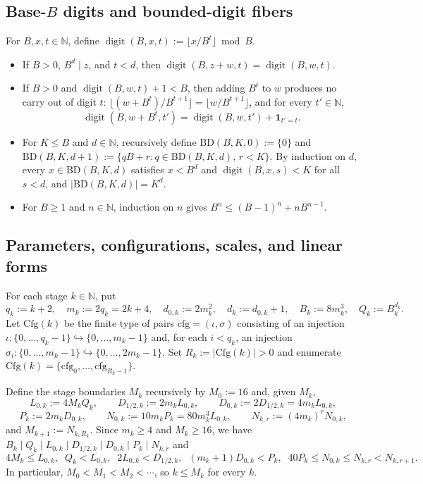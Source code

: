 \documentclass[11pt,a4paper]{amsart}
\newcommand{\digit}{\operatorname{digit}}
\begin{document}
\subsection*{\texorpdfstring{Base-$B$ digits and bounded-digit fibers}{Base-B digits and bounded-digit fibers}}
For $B, x, t \in \mathbb{N}$, define $\digit(B, x, t) := \lfloor x / B^t \rfloor \bmod B$.
\begin{itemize}
\item If $B > 0$, $B^d \mid z$, and $t < d$, then $\digit(B, z + w, t) = \digit(B, w, t)$.
\item If $B > 0$ and $\digit(B, w, t) + 1 < B$, then adding $B^t$ to $w$ produces no carry out of digit $t$: $\lfloor (w + B^t) / B^{t+1} \rfloor = \lfloor w / B^{t+1} \rfloor$, and for every $t' \in \mathbb{N}$,
\[
\digit(B, w + B^t, t') = \digit(B, w, t') + \mathbf{1}_{t' = t}.
\]
\item For $K \le B$ and $d \in \mathbb{N}$, recursively define $\mathrm{BD}(B, K, 0) := \{0\}$ and $\mathrm{BD}(B, K, d + 1) := \{q B + r : q \in \mathrm{BD}(B, K, d),\, r < K\}$. By induction on $d$, every $x \in \mathrm{BD}(B, K, d)$ satisfies $x < B^d$ and $\digit(B, x, s) < K$ for all $s < d$, and $|\mathrm{BD}(B, K, d)| = K^d$.
\item For $B \ge 1$ and $n \in \mathbb{N}$, induction on $n$ gives $B^n \le (B - 1)^n + n B^{n - 1}$.
\end{itemize}

\subsection*{Parameters, configurations, scales, and linear forms}
For each stage $k \in \mathbb{N}$, put
\[
q_k := k + 2, \quad m_k := 2 q_k = 2k + 4, \quad d_{0,k} := 2 m_k^2, \quad d_k := d_{0,k} + 1, \quad B_k := 8 m_k^3, \quad Q_k := B_k^{d_k}.
\]
Let $\mathrm{Cfg}(k)$ be the finite type of pairs $\mathrm{cfg} = (\iota, \sigma)$ consisting of an injection $\iota : \{0, \dots, q_k - 1\} \hookrightarrow \{0, \dots, m_k - 1\}$ and, for each $i < q_k$, an injection $\sigma_i : \{0, \dots, m_k - 1\} \hookrightarrow \{0, \dots, 2 m_k - 1\}$. Set $R_k := |\mathrm{Cfg}(k)| > 0$ and enumerate $\mathrm{Cfg}(k) = \{\mathrm{cfg}_0, \dots, \mathrm{cfg}_{R_k - 1}\}$.

Define the stage boundaries $M_k$ recursively by $M_0 := 16$ and, given $M_k$,
\[
L_{0,k} := 4 M_k Q_k, \qquad D_{1/2,k} := 2 m_k L_{0,k}, \qquad D_{0,k} := 2 D_{1/2,k} = 4 m_k L_{0,k},
\]
\[
P_k := 2 m_k D_{0,k}, \qquad N_{0,k} := 10 m_k P_k = 80 m_k^3 L_{0,k}, \qquad N_{k,r} := (4 m_k)^r N_{0,k},
\]
and $M_{k+1} := N_{k, R_k}$. Since $m_k \ge 4$ and $M_k \ge 16$, we have $B_k \mid Q_k \mid L_{0,k} \mid D_{1/2,k} \mid D_{0,k} \mid P_k \mid N_{k,r}$ and
\[
4 M_k \le L_{0,k}, \;\; Q_k < L_{0,k}, \;\; 2 L_{0,k} < D_{1/2,k}, \;\; (m_k + 1) D_{0,k} < P_k, \;\; 40 P_k \le N_{0,k} \le N_{k,r} < N_{k,r+1}.
\]
In particular, $M_0 < M_1 < M_2 < \cdots$, so $k \le M_k$ for every $k$.
\end{document}
